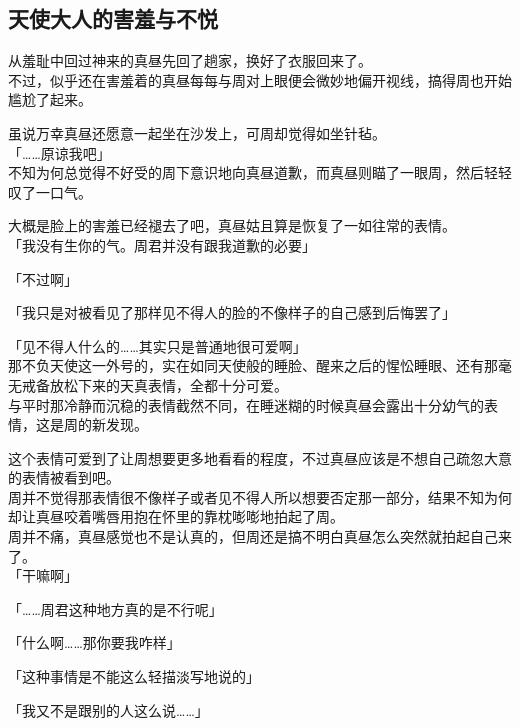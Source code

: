 \subsection{天使大人的害羞与不悦}

从羞耻中回过神来的真昼先回了趟家，换好了衣服回来了。\\

不过，似乎还在害羞着的真昼每每与周对上眼便会微妙地偏开视线，搞得周也开始尴尬了起来。

虽说万幸真昼还愿意一起坐在沙发上，可周却觉得如坐针毡。\\

「……原谅我吧」\\

不知为何总觉得不好受的周下意识地向真昼道歉，而真昼则瞄了一眼周，然后轻轻叹了一口气。

大概是脸上的害羞已经褪去了吧，真昼姑且算是恢复了一如往常的表情。\\

「我没有生你的气。周君并没有跟我道歉的必要」

「不过啊」

「我只是对被看见了那样见不得人的脸的不像样子的自己感到后悔罢了」

「见不得人什么的……其实只是普通地很可爱啊」\\

那不负天使这一外号的，实在如同天使般的睡脸、醒来之后的惺忪睡眼、还有那毫无戒备放松下来的天真表情，全都十分可爱。\\

与平时那冷静而沉稳的表情截然不同，在睡迷糊的时候真昼会露出十分幼气的表情，这是周的新发现。

这个表情可爱到了让周想要更多地看看的程度，不过真昼应该是不想自己疏忽大意的表情被看到吧。\\

周并不觉得那表情很不像样子或者见不得人所以想要否定那一部分，结果不知为何却让真昼咬着嘴唇用抱在怀里的靠枕嘭嘭地拍起了周。\\

周并不痛，真昼感觉也不是认真的，但周还是搞不明白真昼怎么突然就拍起自己来了。\\

「干嘛啊」

「……周君这种地方真的是不行呢」

「什么啊……那你要我咋样」

「这种事情是不能这么轻描淡写地说的」

「我又不是跟别的人这么说……」\\


